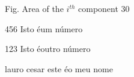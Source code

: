 

\begin{siglas}
\item[Fig.] Area of the $i^{th}$ component
30
\item[456] Isto éum número
\item[123] Isto éoutro número
\item[lauro cesar] este éo meu nome
\end{siglas}
